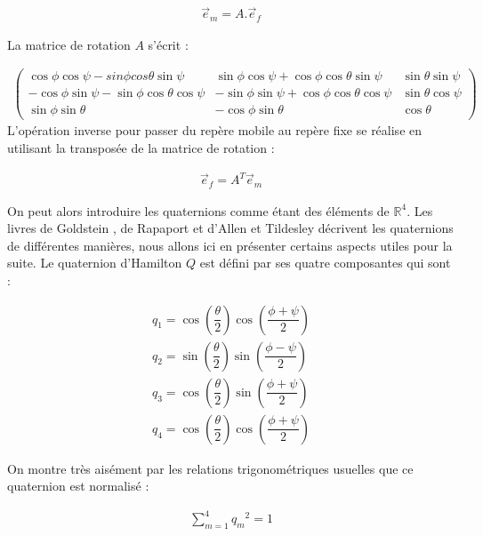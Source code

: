 \documentclass[12pt]{article}
\begin{document}
\begin{eqnarray}
\vec{e}_m=A.\vec{e}_f
\end{eqnarray}

La matrice de rotation $A$ s'écrit \cite{goldstein} :

\begin{eqnarray}
\begin{pmatrix}
\cos \phi \cos \psi - sin \phi cos \theta \sin \psi & \sin \phi \cos \psi + \cos \phi \cos \theta \sin \psi & \sin \theta \sin \psi \\
-\cos \phi \sin \psi - \sin \phi \cos \theta \cos \psi & -\sin \phi \sin \psi + \cos \phi \cos \theta \cos \psi & \sin \theta \cos \psi \\
\sin \phi \sin \theta & -\cos \phi \sin \theta & \cos \theta  
\end{pmatrix}
\end{eqnarray}
L'opération inverse pour passer du repère mobile au repère fixe se réalise en utilisant la transposée de la matrice de rotation :

\begin{eqnarray}
\vec{e}_f= A^T \vec{e}_m
\end{eqnarray}

On peut alors introduire les quaternions comme étant des éléments de $\mathbb{R}^4$. Les livres de Goldstein \cite{goldstein}, de Rapaport \cite{rapaport} et d'Allen et Tildesley \cite{allentildesley} décrivent les quaternions de différentes manières, nous allons ici en présenter certains aspects utiles pour la suite. Le quaternion d'Hamilton $Q$ est défini par ses quatre composantes qui sont :

\begin{eqnarray}
q_1=\cos\left(\dfrac{\theta}{2}\right)\cos\left(\dfrac{\phi+\psi}{2}\right) \nonumber \\
q_2=\sin\left(\dfrac{\theta}{2}\right)\sin\left(\dfrac{\phi-\psi}{2}\right) \nonumber \\ 
q_3=\cos\left(\dfrac{\theta}{2}\right)\sin\left(\dfrac{\phi+\psi}{2}\right) \\
q_4=\cos\left(\dfrac{\theta}{2}\right)\cos\left(\dfrac{\phi+\psi}{2}\right) \nonumber
\end{eqnarray}

On montre très aisément par les relations trigonométriques usuelles que ce quaternion est normalisé :

\begin{eqnarray}
\sum_{m=1}^4 {q_{m}}^2=1
\end{eqnarray}
\end{document}
